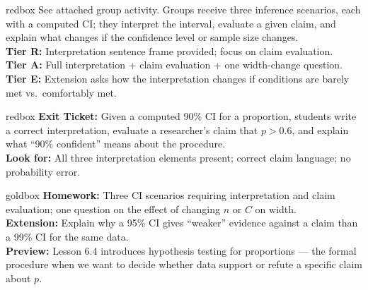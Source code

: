 \documentclass[10pt]{article}
\begin{document}
\begin{skillbox}{redbox}
    See attached group activity. Groups receive three inference scenarios, each with a
    computed CI; they interpret the interval, evaluate a given claim, and explain what
    changes if the confidence level or sample size changes.\\[4pt]
    \textbf{Tier R:} Interpretation sentence frame provided; focus on claim evaluation. \\
    \textbf{Tier A:} Full interpretation + claim evaluation + one width-change question. \\
    \textbf{Tier E:} Extension asks how the interpretation changes if conditions are barely
    met vs.\ comfortably met.
\end{skillbox}

\begin{skillbox}{redbox}
    \textbf{Exit Ticket:} Given a computed 90\% CI for a proportion, students write a
    correct interpretation, evaluate a researcher's claim that $p > 0.6$, and explain what
    ``90\% confident'' means about the procedure. \\[4pt]
    \textbf{Look for:} All three interpretation elements present; correct claim language;
    no probability error.
\end{skillbox}

\begin{skillbox}{goldbox}
    \textbf{Homework:} Three CI scenarios requiring interpretation and claim evaluation;
    one question on the effect of changing $n$ or $C$ on width. \\[4pt]
    \textbf{Extension:} Explain why a 95\% CI gives ``weaker'' evidence against a claim
    than a 99\% CI for the same data. \\[4pt]
    \textbf{Preview:} Lesson 6.4 introduces hypothesis testing for proportions --- the
    formal procedure when we want to decide whether data support or refute a specific claim
    about $p$.
\end{skillbox}
\end{document}
